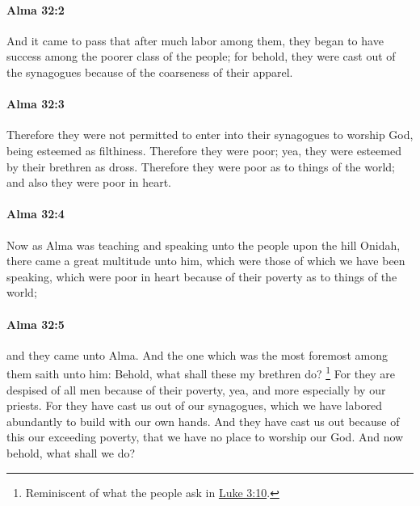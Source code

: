 		\paragraph{Alma 32:2} %
			\label{ALMA-32-2}

			And it came to pass that after much labor among them,
			they began to have success among the poorer class of the people;
			for behold, they were cast out of the synagogues
			because of the coarseness of their apparel.

		\paragraph{Alma 32:3} %
			\label{ALMA-32-3}

			Therefore they were not permitted
			to enter into their synagogues to worship God,
			being esteemed as filthiness.
			Therefore they were poor;
			yea, they were esteemed by their brethren as dross.
			Therefore they were poor as to things of the world;
			and also they were poor in heart.

		\paragraph{Alma 32:4} %
			\label{ALMA-32-4}

			Now as Alma was teaching and speaking unto the people upon the hill Onidah,
			there came a great multitude unto him,
			which were those of which we have been speaking,
			which were poor in heart because of their poverty as to things of the world;

		\paragraph{Alma 32:5} %
			\label{ALMA-32-5}

			and they came unto Alma.
			And the one which was the most foremost among them saith unto him:
			Behold, what shall these my brethren do?%
				\footnote{%
					Reminiscent of what the people ask in \hyperref[LUKE-3-10]{Luke 3:10}.
					}
			For they are despised of all men because of their poverty,
			yea, and more especially by our priests.
			For they have cast us out of our synagogues,
			which we have labored abundantly to build with our own hands.
			And they have cast us out because of this our exceeding poverty,
			that we have no place to worship our God.
			And now behold, what shall we do?

